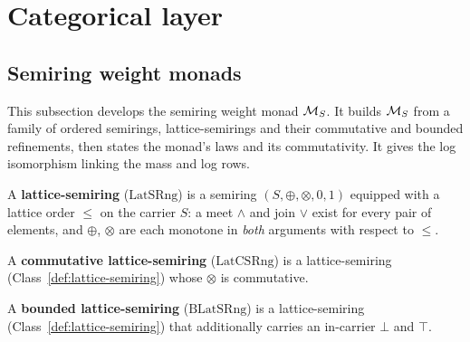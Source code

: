 \section{Categorical layer}  %
\label{sec:categorical-layer}

\subsection{Semiring weight monads}  %
\label{sec:semiring-monads}

This subsection develops the semiring weight monad $\mathcal M_{S}$. It builds
$\mathcal M_{S}$ from a family of ordered semirings, lattice-semirings and
their commutative and bounded refinements, then states the monad's
laws and its commutativity. It gives the log isomorphism linking the
mass and log rows.

\begin{class}
\label{def:lattice-semiring}
\leanok
A \textbf{lattice-semiring} ($\mathrm{LatSRng}$) is a semiring
$(S, \oplus, \otimes, 0, 1)$ equipped
with a lattice order $\le$ on the carrier $S$: a meet $\wedge$ and join
$\vee$ exist for every pair of elements, and $\oplus$, $\otimes$ are
each monotone in \emph{both} arguments with respect to $\le$.
\end{class}

\begin{class}
\label{def:comm-lattice-semiring}
\leanok
A \textbf{commutative lattice-semiring} ($\mathrm{LatCSRng}$) is a
lattice-semiring (Class~\ref{def:lattice-semiring}) whose $\otimes$
is commutative.
\end{class}

\begin{class}
\label{def:bounded-lattice-semiring}
\leanok
A \textbf{bounded lattice-semiring} ($\mathrm{BLatSRng}$) is a
lattice-semiring (Class~\ref{def:lattice-semiring}) that
additionally carries an in-carrier $\bot$ and $\top$.
\end{class}

